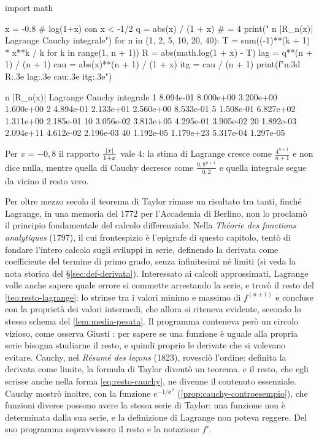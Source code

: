 \begin{python}[Resto di $\log(1+x)$ in $x=-0{,}8$: tre stime]
import math

x = -0.8                          # log(1+x) con x < -1/2
q = abs(x) / (1 + x)              # = 4
print("  n    |R_n(x)|   Lagrange     Cauchy   integrale")
for n in (1, 2, 5, 10, 20, 40):
    T = sum((-1)**(k + 1) * x**k / k for k in range(1, n + 1))
    R = abs(math.log(1 + x) - T)
    lag = q**(n + 1) / (n + 1)
    cau = abs(x)**(n + 1) / (1 + x)
    itg = cau / (n + 1)
    print(f"{n:3d}  {R:.3e}  {lag:.3e}  {cau:.3e}  {itg:.3e}")
\end{python}
\begin{risultato}
  n    |R_n(x)|   Lagrange     Cauchy   integrale
  1  8.094e-01  8.000e+00  3.200e+00  1.600e+00
  2  4.894e-01  2.133e+01  2.560e+00  8.533e-01
  5  1.508e-01  6.827e+02  1.311e+00  2.185e-01
 10  3.056e-02  3.813e+05  4.295e-01  3.905e-02
 20  1.892e-03  2.094e+11  4.612e-02  2.196e-03
 40  1.192e-05  1.179e+23  5.317e-04  1.297e-05
\end{risultato}

Per $x=-0{,}8$ il rapporto $\frac{\lvert x\rvert}{1+x}$ vale $4$: la stima di Lagrange cresce come
$\frac{4^{n+1}}{n+1}$ e non dice nulla, mentre quella di Cauchy decresce come $\frac{0{,}8^{n+1}}{0{,}2}$ e
quella integrale segue da vicino il resto vero.

\begin{notastorica}
Per oltre mezzo secolo il teorema di Taylor rimase un risultato tra tanti, finché
Lagrange, in una memoria del 1772 per l'Accademia di Berlino, non lo proclamò il
principio fondamentale del calcolo differenziale. Nella \emph{Théorie des fonctions
analytiques} (1797), il cui frontespizio è l'epigrafe di questo capitolo, tentò di
fondare l'intero calcolo sugli sviluppi in serie, definendo la derivata come
coefficiente del termine di primo grado, senza infinitesimi né limiti (si veda la nota
storica del \S\ref{sec:def-derivata}). Interessato ai calcoli approssimati, Lagrange volle anche sapere
quale errore si commette arrestando la serie, e trovò il resto del
\cref{teo:resto-lagrange}: lo strinse tra i valori minimo e massimo di $f^{(n+1)}$ e
concluse con la proprietà dei valori intermedi, che allora si riteneva evidente, secondo
lo stesso schema del \cref{lem:media-pesata}. Il programma conteneva però un circolo
vizioso, come osserva Giusti \cite{giusti}: per sapere se una funzione è uguale alla
propria serie bisogna studiarne il resto, e quindi proprio le derivate che si volevano
evitare. Cauchy, nel \emph{Résumé des leçons} (1823), rovesciò l'ordine: definita la
derivata come limite, la formula di Taylor diventò un teorema, e il resto, che egli
scrisse anche nella forma \eqref{eq:resto-cauchy}, ne divenne il contenuto essenziale.
Cauchy mostrò inoltre, con la funzione $e^{-1/x^{2}}$ (\cref{prop:cauchy-controesempio}), che
funzioni diverse possono avere la stessa serie di Taylor: una funzione non è determinata
dalla sua serie, e la definizione di Lagrange non poteva reggere. Del suo programma
sopravvissero il resto e la notazione $f'$.
\end{notastorica}
